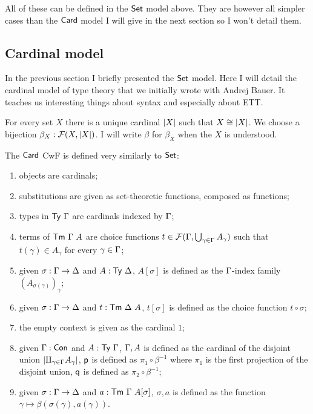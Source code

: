 All of these can be defined in the \(\mathsf{Set}\) model above. They are however all
simpler cases than the \(\mathsf{Card}\) model I will give in the next section so I
won't detail them.

\subsection{Cardinal model}

In the previous section I briefly presented the \(\mathsf{Set}\) model. Here I will
detail the cardinal model of type theory that we initially wrote with Andrej
Bauer. It teaches us interesting things about syntax and especially about
\acrshort{ETT}.

For every set \(X\) there is a unique cardinal \(\left|X\right|\) such that
\(X \cong \left|X\right|\). We choose a bijection \(\beta_X : \mathcal{F}(X,\left|X\right|)\).
I will write \(\beta\) for \(\beta_X\) when the \(X\) is understood.

The \(\mathsf{Card}\) \acrshort{CwF} is defined very similarly to \(\mathsf{Set}\):
\begin{enumerate}
  \item objects are cardinals;
  \item substitutions are given as set-theoretic functions, composed as
  functions;
  \item types in \(\mathsf{Ty}\ \Gamma\) are cardinals indexed by \(\Gamma\);
  \item terms of \(\mathsf{Tm}\ \Gamma\ A\) are choice functions
  \(t \in \mathcal{F}(\Gamma,\bigcup_{\gamma \in \Gamma} A_\gamma)\) such that
  \(t(\gamma) \in A_\gamma\) for every \(\gamma \in \Gamma\);
  \item given \(\sigma : \Gamma \to \Delta\) and \(A : \mathsf{Ty}\ \Delta\), \(A[\sigma]\)
  is defined as the \(\Gamma\)-index family \((A_{\sigma(\gamma)})_\gamma\);
  \item given \(\sigma : \Gamma \to \Delta\) and \(t : \mathsf{Tm}\ \Delta\ A\), \(t[\sigma]\)
  is defined as the choice function \(t \circ \sigma\);
  \item the empty context is given as the cardinal \(1\);
  \item given \(\Gamma : \mathsf{Con}\) and \(A : \mathsf{Ty}\ \Gamma\), \(\Gamma, A\) is defined as
  the cardinal of the disjoint union
  \(\left|\amalg_{\gamma \in \Gamma} A_\gamma\right|\), \(\mathsf{p}\) is defined as
  \(\pi_1 \circ \beta^{-1}\) where \(\pi_1\) is the first projection of the
  disjoint union, \(\mathsf{q}\) is defined as \(\pi_2 \circ \beta^{-1}\);
  \item given \(\sigma : \Gamma \to \Delta\) and \(a : \mathsf{Tm}\ \Gamma\ A[\sigma]\),
  \(\sigma, a\) is defined as the function
  \(\gamma \mapsto \beta(\sigma(\gamma), a(\gamma))\).
\end{enumerate}

